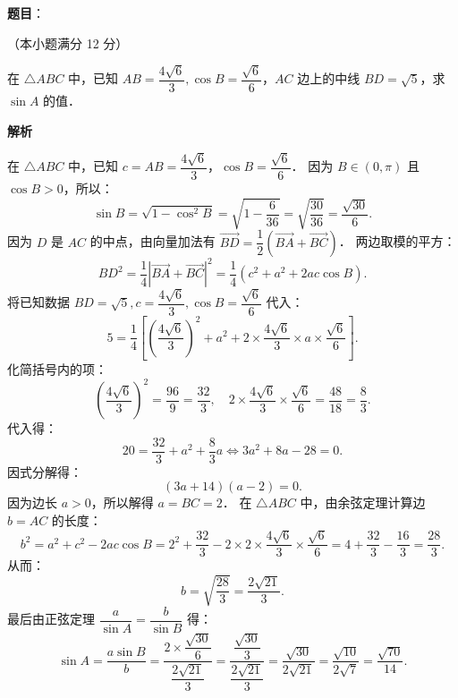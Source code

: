 \begin{answer}

\textbf{题目}：

（本小题满分 12 分）

在 $\triangle ABC$ 中，已知 $AB = \dfrac{4\sqrt{6}}{3}, \cos B = \dfrac{\sqrt{6}}{6}$，$AC$ 边上的中线 $BD = \sqrt{5}$，求 $\sin A$ 的值．

\textbf{解析}

在 $\triangle ABC$ 中，已知 $c = AB = \dfrac{4\sqrt{6}}{3}$，$\cos B = \dfrac{\sqrt{6}}{6}$．
因为 $B \in (0, \pi)$ 且 $\cos B > 0$，所以：
\nopagebreak[4]
\[
\sin B = \sqrt{1 - \cos^2 B} = \sqrt{1 - \frac{6}{36}} = \sqrt{\frac{30}{36}} = \frac{\sqrt{30}}{6}.
\]
因为 $D$ 是 $AC$ 的中点，由向量加法有 $\vec{BD} = \dfrac{1}{2}(\vec{BA} + \vec{BC})$．
两边取模的平方：
\nopagebreak[4]
\[
BD^2 = \frac{1}{4}|\vec{BA} + \vec{BC}|^2 = \frac{1}{4}\left(c^2 + a^2 + 2ac\cos B\right).
\]
将已知数据 $BD = \sqrt{5}, c = \dfrac{4\sqrt{6}}{3}, \cos B = \dfrac{\sqrt{6}}{6}$ 代入：
\nopagebreak[4]
\[
5 = \frac{1}{4}\left[\left(\frac{4\sqrt{6}}{3}\right)^2 + a^2 + 2 \times \frac{4\sqrt{6}}{3} \times a \times \frac{\sqrt{6}}{6}\right].
\]
化简括号内的项：
\nopagebreak[4]
\[
\left(\frac{4\sqrt{6}}{3}\right)^2 = \frac{96}{9} = \frac{32}{3}, \quad 2 \times \frac{4\sqrt{6}}{3} \times \frac{\sqrt{6}}{6} = \frac{48}{18} = \frac{8}{3}.
\]
代入得：
\nopagebreak[4]
\[
20 = \frac{32}{3} + a^2 + \frac{8}{3}a \iff 3a^2 + 8a - 28 = 0.
\]
因式分解得：
\nopagebreak[4]
\[
(3a + 14)(a - 2) = 0.
\]
因为边长 $a > 0$，所以解得 $a = BC = 2$．
在 $\triangle ABC$ 中，由余弦定理计算边 $b = AC$ 的长度：
\nopagebreak[4]
\[
b^2 = a^2 + c^2 - 2ac\cos B = 2^2 + \frac{32}{3} - 2 \times 2 \times \frac{4\sqrt{6}}{3} \times \frac{\sqrt{6}}{6} = 4 + \frac{32}{3} - \frac{16}{3} = \frac{28}{3}.
\]
从而：
\nopagebreak[4]
\[
b = \sqrt{\frac{28}{3}} = \frac{2\sqrt{21}}{3}.
\]
最后由正弦定理 $\dfrac{a}{\sin A} = \dfrac{b}{\sin B}$ 得：
\nopagebreak[4]
\[
\sin A = \frac{a\sin B}{b} = \frac{2 \times \dfrac{\sqrt{30}}{6}}{\dfrac{2\sqrt{21}}{3}} = \frac{\dfrac{\sqrt{30}}{3}}{\dfrac{2\sqrt{21}}{3}} = \frac{\sqrt{30}}{2\sqrt{21}} = \frac{\sqrt{10}}{2\sqrt{7}} = \frac{\sqrt{70}}{14}.
\]


\end{answer}
